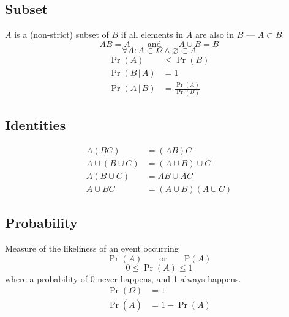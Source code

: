 \documentclass{article}
\begin{document}
\begin{multicols}{3}
    \subsection{Subset}
    \(A\) is a (non-strict) subset of \(B\) if all elements in \(A\) are also in \(B\) --- \(A \subset B\).
    \begin{equation*}
        AB = A \quad\quad \text{and} \quad\quad A \cup B = B
    \end{equation*}
    \begin{equation*}
        \forall A:A\subset \Omega \land \varnothing \subset A
    \end{equation*}
    \begin{align*}
        \Pr{\left( A \right)}             & \leq \Pr{\left( B \right)}                            \\
        \Pr{\left( B \,\vert\, A \right)} & = 1                                                   \\
        \Pr{\left( A \,\vert\, B \right)} & = \frac{\Pr{\left( A \right)}}{\Pr{\left( B \right)}}
    \end{align*}
    \subsection{Identities}
    \begin{align*}
        A \left( BC \right)            & = \left( AB \right) C                             \\
        A \cup \left( B \cup C \right) & = \left( A \cup B \right) \cup C                  \\
        A \left(B \cup C\right)        & = AB \cup AC                                      \\
        A \cup BC                      & = \left( A \cup B \right) \left( A \cup C \right)
    \end{align*}
    \subsection{Probability}
    Measure of the likeliness of an event occurring
    \begin{equation*}
        \Pr{\left( A \right)} \quad\quad \text{or} \quad\quad \mathrm{P}\left( A \right)
    \end{equation*}
    \begin{equation*}
        0 \leq \Pr{\left( A \right)} \leq 1
    \end{equation*}
    where a probability of 0 never happens, and 1 always happens.
    \begin{align*}
        \Pr{\left( \Omega \right)}       & = 1                         \\
        \Pr{\left( \overline{A} \right)} & = 1 - \Pr{\left( A \right)}
    \end{align*}

\end{multicols}
\end{document}
